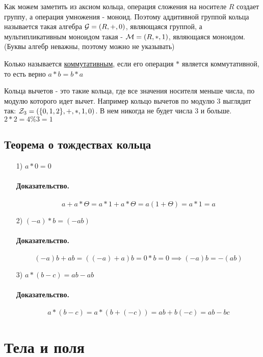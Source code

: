 \documentclass{report}
\begin{document}
\medskip

Как можем заметить из аксиом кольца, операция сложения на носителе $R$ создает группу,
а операция умножения - моноид. Поэтому аддитивной группой кольца называется такая алгебра
${\cal G} = (R, +, 0)$, являющаяся группой, а мультипликативным моноидом такая -
${\cal M} = (R, *, 1)$, являющаяся моноидом. (Буквы алгебр неважны, поэтому можно не указывать)

\medskip

Колько называется \underline{коммутативным}, если его операция $*$ является
коммутативной, то есть верно $a * b = b * a$

\medskip

Кольца вычетов - это такие кольца, где все значения носителя меньше числа, по модулю
которого идет вычет. Например кольцо вычетов по модулю 3 выглядит так: ${\cal Z}_{3} = (\{0,1,2\}, +, *, 1, 0)$.
В нем никогда не будет числа 3 и больше. $2 * 2 = 4 \% 3 = 1$

\medskip

\subsection{Теорема о тождествах кольца}
\begin{itemize}
	\item[1)] $a * 0 = 0$
		\paragraph*{Доказательство.}
		\[
		a + a * \Theta = a * 1 + a*\Theta = a(1 + \Theta) = a * 1 = a
		\] 
	\item[2)] $(-a)*b = (-ab)$
		\paragraph*{Доказательство.}
		\[
		(-a)b + ab = ((-a) + a)b = 0 * b = 0 \implies (-a)b = -(ab)
		\] 
	\item[3)] $a * (b - c) = ab - ab$
		\paragraph*{Доказательство.}
		\[
		a * (b - c) = a * (b + (-c)) = ab + b(-c) = ab - bc
		
		\] 
\end{itemize}

\newpage

\section{Тела и поля}
\end{document}
